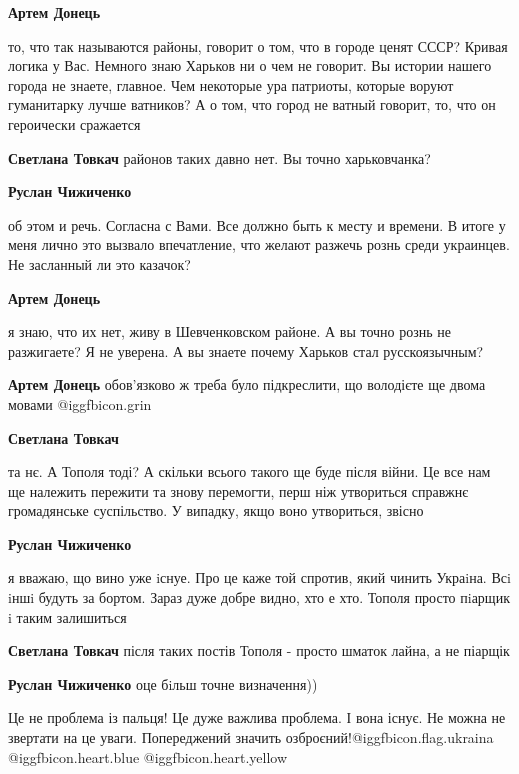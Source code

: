 \begin{itemize}
\begin{itemize}
\textbf{Артем Донець} 

то, что так называются районы, говорит о том, что в городе ценят СССР? Кривая
логика у Вас. Немного знаю Харьков ни о чем не говорит. Вы истории нашего
города не знаете, главное. Чем некоторые ура патриоты, которые воруют
гуманитарку лучше ватников? А о том, что город не ватный говорит, то, что он
героически сражается

\textbf{Светлана Товкач} районов таких давно нет. Вы точно харьковчанка?

\textbf{Руслан Чижиченко} 

об этом и речь. Согласна с Вами. Все должно быть к месту и времени. В итоге у
меня лично это вызвало впечатление, что желают разжечь рознь среди украинцев.
Не засланный ли это казачок?

\textbf{Артем Донець} 

я знаю, что их нет, живу в Шевченковском районе. А вы точно рознь не
разжигаете? Я не уверена. А вы знаете почему Харьков стал русскоязычным?

\textbf{Артем Донець} обов'язково ж треба було підкреслити, що володієте ще двома мовами  @igg{fbicon.grin} 

\textbf{Светлана Товкач} 

та нє. А Тополя тоді? А скільки всього такого ще буде після війни. Це все нам
ще належить пережити та знову перемогти, перш ніж утвориться справжнє
громадянське суспільство. У випадку, якщо воно утвориться, звісно

\textbf{Руслан Чижиченко} 

я вважаю, що вино уже iснуе. Про це каже той спротив, який чинить Украiна. Всi
iншi будуть за бортом. Зараз дуже добре видно, хто е хто. Тополя просто пiарщик
i таким залишиться

\textbf{Светлана Товкач} після таких постів Тополя - просто шматок лайна, а не піарщік

\textbf{Руслан Чижиченко} оце бiльш точне визначення))


Це не проблема із пальця! Це дуже важлива проблема. І вона існує. Не можна не
звертати на це уваги. Попереджений значить озброєний!@igg{fbicon.flag.ukraina} @igg{fbicon.heart.blue}  @igg{fbicon.heart.yellow} 

\end{itemize} %

\end{itemize} %
